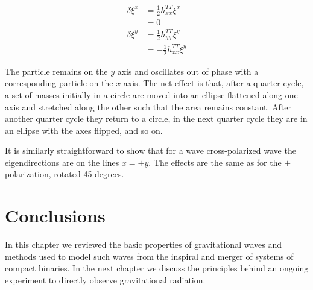 \begin{align*}
\delta \xi^x &= \frac{1}{2} h^{TT}_{xx} \xi^x \\
&= 0 \\
\delta \xi^y &= \frac{1}{2} h^{TT}_{yy} \xi^y \\
&= - \frac{1}{2} h^{TT}_{xx} \xi^y
\end{align*}

The particle remains on the $y$ axis and oscillates out of phase with
a corresponding particle on the $x$ axis.  The net effect is that,
after a quarter cycle, a set of masses initially in a circle are moved
into an ellipse flattened along one axis and stretched along the other
such that the area remains constant.  After another quarter cycle they
return to a circle, in the next quarter cycle they are in an ellipse
with the axes flipped, and so on.

It is similarly straightforward to show that for a wave
cross-polarized wave the eigendirections are on the lines $x=\pm y$.
The effects are the same as for the $+$ polarization, rotated 45
degrees.

\section{Conclusions}

In this chapter we reviewed the basic properties of gravitational
waves and methods used to model such waves from the inspiral and
merger of systems of compact binaries.  In the next chapter we discuss
the principles behind an ongoing experiment to directly observe
gravitational radiation.


